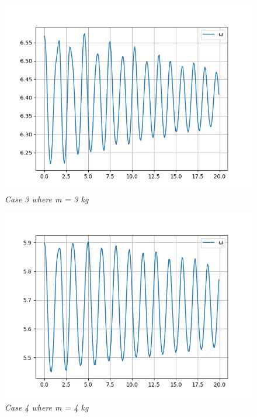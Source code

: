         \begin{figure}[H]
            \centering
            \includegraphics{Appendix/RExpPictures/AF/afm3.png}
            \caption{\textit{Case 3 where m = 3 kg}}
            \label{}
        \end{figure}
            
        \begin{figure}[H]
            \centering
            \includegraphics{Appendix/RExpPictures/AF/afm4.png}
            \caption{\textit{Case 4 where m = 4 kg}}
            \label{}
        \end{figure}
            

